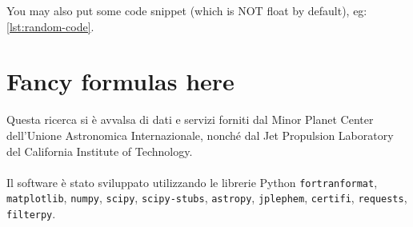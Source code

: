 \documentclass[12pt,a4paper,openright,twoside]{book}
\begin{document}
You may also put some code snippet (which is NOT float by default), eg: \cref{lst:random-code}.



\section{Fancy formulas here}
\fi


\backmatter


% 



\begin{acknowledgements} %
Questa ricerca si è avvalsa di dati e servizi forniti dal Minor Planet Center dell'Unione Astronomica Internazionale, nonché dal Jet Propulsion Laboratory del California Institute of Technology. \\\null\\
Il software è stato sviluppato utilizzando le librerie Python \lstinline{fortranformat},\\ \lstinline{matplotlib}, \lstinline{numpy}, \lstinline{scipy}, \lstinline{scipy-stubs}, \lstinline{astropy}, \lstinline{jplephem}, \lstinline{certifi}, \lstinline{requests}, \lstinline{filterpy}.
\end{acknowledgements}
\end{document}
